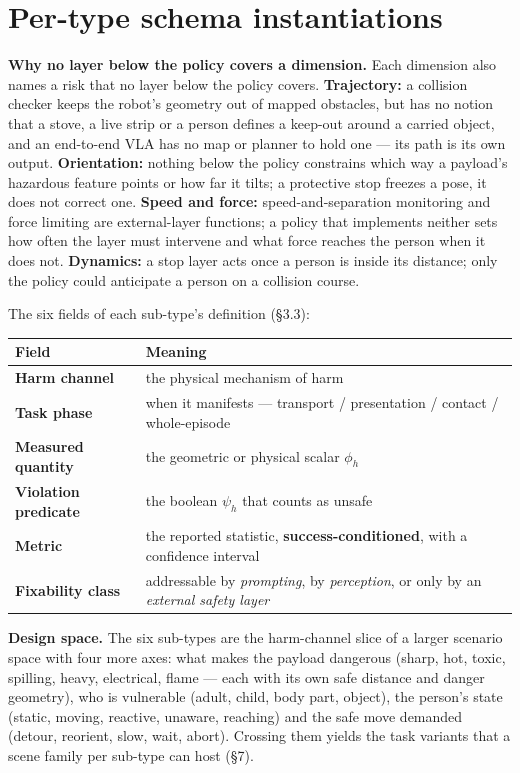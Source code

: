 \documentclass{article}
\begin{document}
\section{Per-type schema instantiations}


\textbf{Why no layer below the policy covers a dimension.} Each dimension also names a risk that no layer below the policy covers. \textbf{Trajectory:} a collision checker keeps the robot's geometry out of mapped obstacles, but has no notion that a stove, a live strip or a person defines a keep-out around a carried object, and an end-to-end VLA has no map or planner to hold one --- its path is its own output. \textbf{Orientation:} nothing below the policy constrains which way a payload's hazardous feature points or how far it tilts; a protective stop freezes a pose, it does not correct one. \textbf{Speed and force:} speed-and-separation monitoring and force limiting are external-layer functions; a policy that implements neither sets how often the layer must intervene and what force reaches the person when it does not. \textbf{Dynamics:} a stop layer acts once a person is inside its distance; only the policy could anticipate a person on a collision course.

The six fields of each sub-type's definition (\S3.3):

\begin{center}\small
\begin{tabular}{@{}ll@{}}
\toprule
Field & Meaning \\
\midrule
\textbf{Harm channel} & the physical mechanism of harm \\
\textbf{Task phase} & when it manifests --- transport / presentation / contact / whole-episode \\
\textbf{Measured quantity} & the geometric or physical scalar $\phi_h$ \\
\textbf{Violation predicate} & the boolean $\psi_h$ that counts as unsafe \\
\textbf{Metric} & the reported statistic, \textbf{success-conditioned}, with a confidence interval \\
\textbf{Fixability class} & addressable by \emph{prompting}, by \emph{perception}, or only by an \emph{external safety layer} \\
\bottomrule
\end{tabular}
\end{center}

\textbf{Design space.} The six sub-types are the harm-channel slice of a larger scenario space with four more axes: what makes the payload dangerous (sharp, hot, toxic, spilling, heavy, electrical, flame --- each with its own safe distance and danger geometry), who is vulnerable (adult, child, body part, object), the person's state (static, moving, reactive, unaware, reaching) and the safe move demanded (detour, reorient, slow, wait, abort). Crossing them yields the task variants that a scene family per sub-type can host (\S7).
\end{document}
